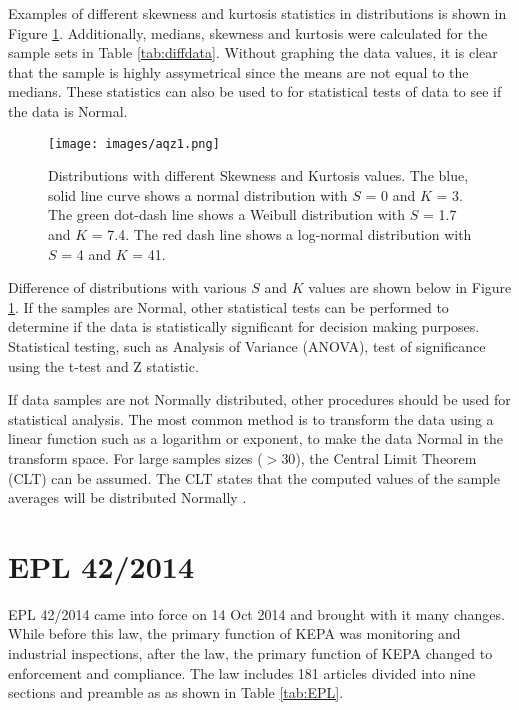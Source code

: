 Examples of different skewness and kurtosis statistics in distributions is shown in Figure \ref{fig:distr}. Additionally, medians, skewness and kurtosis were calculated for the sample sets in Table \ref{tab:diffdata}. Without graphing the data values, it is clear that the sample is highly assymetrical since the means are not equal to the medians. These statistics can also be used to for statistical tests of data to see if the data is Normal. 
%
\begin{figure}[!htpb]
\centering
\texttt{[image: images/aqz1.png]} 
\caption[Distributions with different Skewness and Kurtosis values.]{Distributions with different Skewness and Kurtosis values. The blue, solid line curve shows a normal distribution with $S$ = 0 and $K$ = 3. The green dot-dash line shows a Weibull distribution with $S$ = 1.7 and $K$ = 7.4.  The red dash line shows a log-normal distribution with $S$ = 4 and $K$ = 41. }
\label{fig:distr}
\end{figure}
%
Difference of distributions with various $S$ and $K$ values are shown below in Figure \ref{fig:distr}.  If the samples are Normal, other statistical tests can be performed to determine if the data is statistically significant for decision making purposes. Statistical testing, such as Analysis of Variance (ANOVA), test of significance using the t-test and Z statistic.

If data samples are not Normally distributed, other procedures should be used for statistical analysis. The most common method is to transform the data using a linear function such as a logarithm or exponent, to make the data Normal in the transform space. For large samples sizes ($>30$), the Central Limit Theorem (CLT) can be assumed. The CLT states that the computed values of the sample averages will be distributed Normally \citep{Freeman2017a}. 

\section{EPL 42/2014}

EPL 42/2014 came into force on 14 Oct 2014 and brought with it many changes. While before this law, the primary function of KEPA was monitoring and industrial inspections, after the law, the primary function of KEPA changed to enforcement and compliance. The law includes 181 articles divided into nine sections and preamble as as shown in Table \ref{tab:EPL}.

